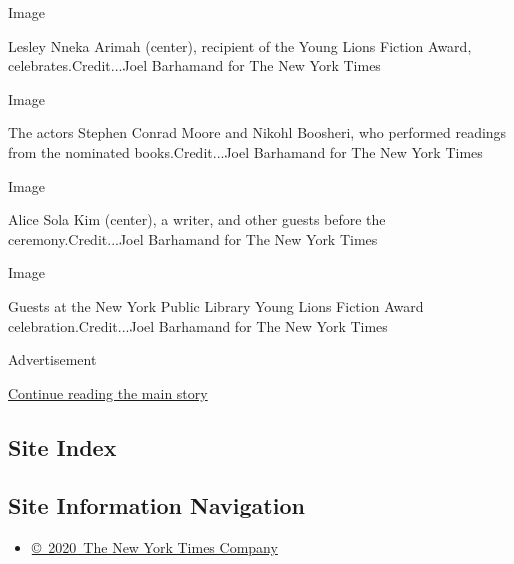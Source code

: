 Image

Lesley Nneka Arimah (center), recipient of the Young Lions Fiction
Award, celebrates.Credit...Joel Barhamand for The New York Times

Image

The actors Stephen Conrad Moore and Nikohl Boosheri, who performed
readings from the nominated books.Credit...Joel Barhamand for The New
York Times

Image

Alice Sola Kim (center), a writer, and other guests before the
ceremony.Credit...Joel Barhamand for The New York Times

Image

Guests at the New York Public Library Young Lions Fiction Award
celebration.Credit...Joel Barhamand for The New York Times

Advertisement

\protect\hyperlink{after-bottom}{Continue reading the main story}

\hypertarget{site-index}{%
\subsection{Site Index}\label{site-index}}

\hypertarget{site-information-navigation}{%
\subsection{Site Information
Navigation}\label{site-information-navigation}}

\begin{itemize}
\tightlist
\item
  \href{https://help.nytimes3xbfgragh.onion/hc/en-us/articles/115014792127-Copyright-notice}{©~2020~The
  New York Times Company}
\end{itemize}

